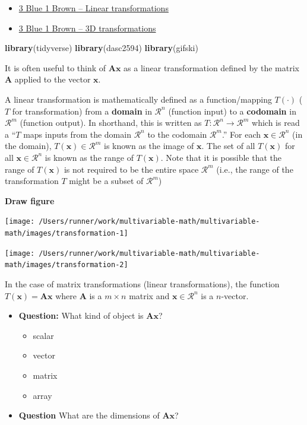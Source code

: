 \documentclass[
]{book}
\newenvironment{Shaded}{\begin{snugshade}}{\end{snugshade}}
\newcommand{\KeywordTok}[1]{\textcolor[rgb]{0.13,0.29,0.53}{\textbf{#1}}}
\newcommand{\NormalTok}[1]{#1}
\providecommand{\tightlist}{%
  \setlength{\itemsep}{0pt}\setlength{\parskip}{0pt}}
\theoremstyle{definition}
\theoremstyle{definition}
\theoremstyle{definition}
\theoremstyle{definition}
\theoremstyle{remark}
\begin{document}
\begin{itemize}
\item
  \href{https://www.3blue1brown.com/lessons/linear-transformations}{3 Blue 1 Brown -- Linear transformations}
\item
  \href{https://www.3blue1brown.com/lessons/3d-transformations}{3 Blue 1 Brown -- 3D transformations}
\end{itemize}

\begin{Shaded}
\begin{Highlighting}[]
\KeywordTok{library}\NormalTok{(tidyverse)}
\KeywordTok{library}\NormalTok{(dasc2594)}
\KeywordTok{library}\NormalTok{(gifski)}
\end{Highlighting}
\end{Shaded}

It is often useful to think of \(\mathbf{A}\mathbf{x}\) as a linear transformation defined by the matrix \(\mathbf{A}\) applied to the vector \(\mathbf{x}\).

A linear transformation is mathematically defined as a function/mapping \(T(\cdot)\) (\(T\) for transformation) from a \textbf{domain} in \(\mathcal{R}^n\) (function input) to a \textbf{codomain} in \(\mathcal{R}^m\) (function output). In shorthand, this is written as \(T:\mathcal{R}^n \rightarrow \mathcal{R}^m\) which is read a ``\(T\) maps inputs from the domain \(\mathcal{R}^n\) to the codomain \(\mathcal{R}^m\).'' For each \(\mathbf{x} \in \mathcal{R}^n\) (in the domain), \(T(\mathbf{x}) \in \mathcal{R}^m\) is known as the image of \(\mathbf{x}\). The set of all \(T(\mathbf{x})\) for all \(\mathbf{x} \in \mathcal{R}^n\) is known as the range of \(T(\mathbf{x})\). Note that it is possible that the range of \(T(\mathbf{x})\) is not required to be the entire space \(\mathcal{R}^m\) (i.e., the range of the transformation \(T\) might be a subset of \(\mathcal{R}^m\))

\textbf{Draw figure}

\texttt{[image: /Users/runner/work/multivariable-math/multivariable-math/images/transformation-1]}

\texttt{[image: /Users/runner/work/multivariable-math/multivariable-math/images/transformation-2]}

In the case of matrix transformations (linear transformations), the function \(T(\mathbf{x}) = \mathbf{A} \mathbf{x}\) where \(\mathbf{A}\) is a \(m \times n\) matrix and \(\mathbf{x} \in \mathcal{R}^n\) is a \(n\)-vector.

\begin{itemize}
\tightlist
\item
  \textbf{Question:} What kind of object is \(\mathbf{A} \mathbf{x}\)?

  \begin{itemize}
  \tightlist
  \item
    scalar
  \item
    vector
  \item
    matrix
  \item
    array
  \end{itemize}
\item
  \textbf{Question} What are the dimensions of \(\mathbf{A} \mathbf{x}\)?
\end{itemize}
\end{document}
